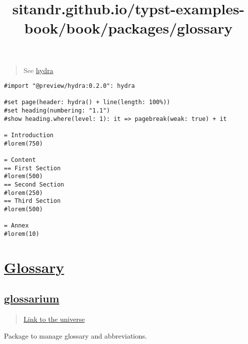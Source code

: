 \begin{quote}
See \href{https://github.com/tingerrr/hydra}{hydra}
\end{quote}

\begin{verbatim}
#import "@preview/hydra:0.2.0": hydra

#set page(header: hydra() + line(length: 100%))
#set heading(numbering: "1.1")
#show heading.where(level: 1): it => pagebreak(weak: true) + it

= Introduction
#lorem(750)

= Content
== First Section
#lorem(500)
== Second Section
#lorem(250)
== Third Section
#lorem(500)

= Annex
#lorem(10)
\end{verbatim}

\pandocbounded{}

\pandocbounded{}

\pandocbounded{}

\pandocbounded{}

\pandocbounded{}


\title{sitandr.github.io/typst-examples-book/book/packages/glossary}

\section{\texorpdfstring{\hyperref[glossary]{Glossary}}{Glossary}}\label{glossary}

\subsection{\texorpdfstring{\hyperref[glossarium]{glossarium}}{glossarium}}\label{glossarium}

\begin{quote}
\href{https://typst.app/universe/package/glossarium}{Link to the
universe}
\end{quote}

Package to manage glossary and abbreviations.

